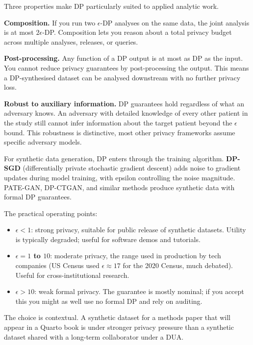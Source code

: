 \documentclass[
  letterpaper,
  11pt]{scrbook}
\providecommand{\tightlist}{%
  \setlength{\itemsep}{0pt}\setlength{\parskip}{0pt}}
\begin{document}
Three properties make DP particularly suited to applied analytic work.

\textbf{Composition.} If you run two \(\epsilon\)-DP analyses on the
same data, the joint analysis is at most \(2\epsilon\)-DP. Composition
lets you reason about a total privacy budget across multiple analyses,
releases, or queries.

\textbf{Post-processing.} Any function of a DP output is at most as DP
as the input. You cannot reduce privacy guarantees by post-processing
the output. This means a DP-synthesised dataset can be analysed
downstream with no further privacy loss.

\textbf{Robust to auxiliary information.} DP guarantees hold regardless
of what an adversary knows. An adversary with detailed knowledge of
every other patient in the study still cannot infer information about
the target patient beyond the \(\epsilon\) bound. This robustness is
distinctive, most other privacy frameworks assume specific adversary
models.

For synthetic data generation, DP enters through the training algorithm.
\textbf{DP-SGD} (differentially private stochastic gradient descent)
adds noise to gradient updates during model training, with epsilon
controlling the noise magnitude. PATE-GAN, DP-CTGAN, and similar methods
produce synthetic data with formal DP guarantees.

The practical operating points:

\begin{itemize}
\tightlist
\item
  \textbf{\(\epsilon < 1\)}: strong privacy, suitable for public release
  of synthetic datasets. Utility is typically degraded; useful for
  software demos and tutorials.
\item
  \textbf{\(\epsilon = 1\) to \(10\)}: moderate privacy, the range used
  in production by tech companies (US Census used
  \(\epsilon \approx 17\) for the 2020 Census, much debated). Useful for
  cross-institutional research.
\item
  \textbf{\(\epsilon > 10\)}: weak formal privacy. The guarantee is
  mostly nominal; if you accept this you might as well use no formal DP
  and rely on auditing.
\end{itemize}

The choice is contextual. A synthetic dataset for a methods paper that
will appear in a Quarto book is under stronger privacy pressure than a
synthetic dataset shared with a long-term collaborator under a DUA.
\end{document}
